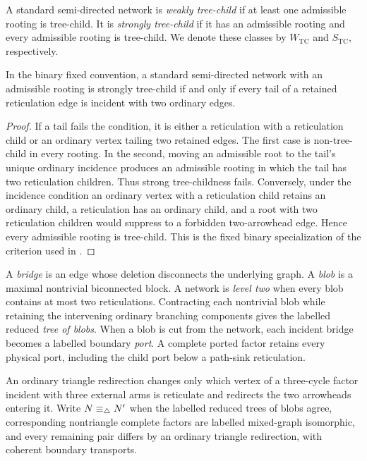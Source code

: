 \begin{definition}
A standard semi-directed network is \emph{weakly tree-child} if at least one
admissible rooting is tree-child.  It is \emph{strongly tree-child} if it has
an admissible rooting and every admissible rooting is tree-child.  We denote
these classes by \(W_{\mathrm{TC}}\) and \(S_{\mathrm{TC}}\), respectively.
\end{definition}

\begin{lemma}\label{lem:no-omnian}
In the binary fixed convention, a standard semi-directed network with an
admissible rooting is strongly tree-child if and only if every tail of a
retained reticulation edge is incident with two ordinary edges.
\end{lemma}

\begin{proof}
If a tail fails the condition, it is either a reticulation with a
reticulation child or an ordinary vertex tailing two retained edges.  The
first case is non-tree-child in every rooting.  In the second, moving an
admissible root to the tail's unique ordinary incidence produces an
admissible rooting in which the tail has two reticulation children.  Thus
strong tree-childness fails.  Conversely, under the incidence condition an
ordinary vertex with a reticulation child retains an ordinary child, a
reticulation has an ordinary child, and a root with two reticulation children
would suppress to a forbidden two-arrowhead edge.  Hence every admissible
rooting is tree-child.  This is the fixed binary specialization of the
criterion used in \cite{EnglanderEtAl2026,HoltgrefeEtAl2026}.
\end{proof}

A \emph{bridge} is an edge whose deletion disconnects the underlying graph.
A \emph{blob} is a maximal nontrivial biconnected block.  A network is
\emph{level two} when every blob contains at most two reticulations.
Contracting each nontrivial blob while retaining the intervening ordinary
branching components gives the labelled reduced \emph{tree of blobs}.  When a
blob is cut from the network, each incident bridge becomes a labelled
boundary \emph{port}.  A complete ported factor retains every physical port,
including the child port below a path-sink reticulation.

\begin{definition}\label{def:triangle}
An ordinary triangle redirection changes only which vertex of a three-cycle
factor incident with three external arms is reticulate and redirects the two
arrowheads entering it.  Write \(N\equiv_\triangle N'\) when the labelled reduced
trees of blobs agree, corresponding nontriangle complete factors are
labelled mixed-graph isomorphic, and every remaining pair differs by an
ordinary triangle redirection, with coherent boundary transports.
\end{definition}

